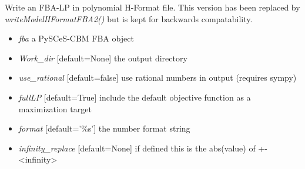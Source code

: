 \documentclass[a4paper,11pt,english]{sphinxmanual}
\begin{document}
\begin{fulllineitems}
\label{modules_doc:cbmpy.CBWrite.writeModelHFormatFBA}
Write an FBA-LP in polynomial H-Format file. This version has been replaced by \emph{writeModelHFormatFBA2()}
but is kept for backwards compatability.
\begin{itemize}
\item {} 
\emph{fba} a PySCeS-CBM FBA object

\item {} 
\emph{Work\_dir} {[}default=None{]} the output directory

\item {} 
\emph{use\_rational} {[}default=false{]} use rational numbers in output (requires sympy)

\item {} 
\emph{fullLP} {[}default=True{]} include the default objective function as a maximization target

\item {} 
\emph{format} {[}default='\%s'{]} the number format string

\item {} 
\emph{infinity\_replace} {[}default=None{]} if defined this is the abs(value) of +-\textless{}infinity\textgreater{}

\end{itemize}

\end{fulllineitems}

\end{document}
